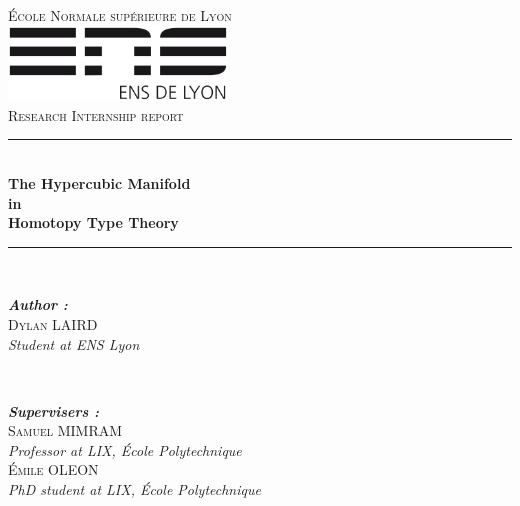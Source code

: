 \documentclass{report}
\begin{document}
\begin{titlepage}
\newcommand{\HRule}{\rule{\linewidth}{0.5mm}} %
\renewcommand{\bibname}{Bibliography and links}
\center %


\textsc{\LARGE École Normale supérieure de Lyon}\\[1cm] %
\includegraphics[height=2cm, keepaspectratio]{École_normale_supérieure_de_Lyon_Logo.svg.png}\\[1cm]

\textsc{\LARGE Research Internship report}\\[1.25cm]
\HRule \\[0.4cm]
{ \huge \bfseries The Hypercubic Manifold}\\[0.3cm]
{ \huge \bfseries in}\\[0.5cm] 
{ \huge \bfseries Homotopy Type Theory}\\[0.3cm]
\HRule \\[2cm]
\begin{minipage}{0.4\textwidth}
\begin{flushleft}
\emph{\Large \emph{\textbf{Author :}}}\\[0.2cm]
\textsc{\Large Dylan LAIRD}\\
\textit{Student at ENS Lyon}
\end{flushleft}
\end{minipage}
~
\begin{minipage}{0.4\textwidth}
\begin{flushleft}
\emph{\Large \emph{\textbf{Supervisers :}}}\\[0.2cm]
\textsc{\Large Samuel MIMRAM}\\
\textit{Professor at LIX, École Polytechnique}\\[0.1cm]
\textsc{\Large Émile OLEON}\\
\textit{PhD student at LIX, École Polytechnique}\\
\end{flushleft}
\end{minipage}\\[0.5cm]


\end{titlepage}
\end{document}
